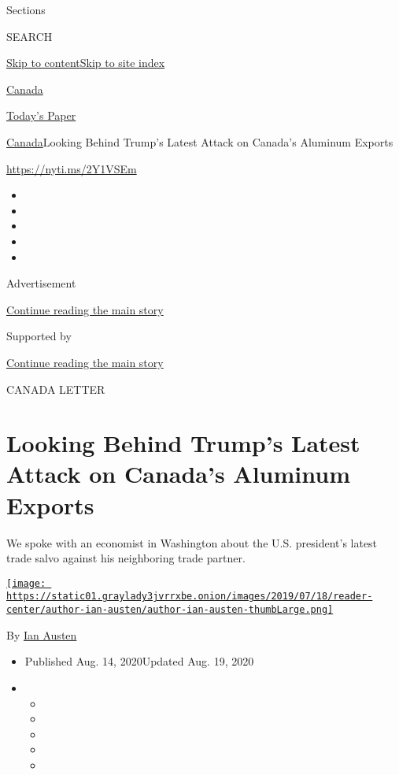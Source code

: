 Sections

SEARCH

\protect\hyperlink{site-content}{Skip to
content}\protect\hyperlink{site-index}{Skip to site index}

\href{https://www.nytimes3xbfgragh.onion/section/world/canada}{Canada}

\href{https://myaccount.nytimes3xbfgragh.onion/auth/login?response_type=cookie\&client_id=vi}{}

\href{https://www.nytimes3xbfgragh.onion/section/todayspaper}{Today's
Paper}

\href{/section/world/canada}{Canada}\textbar{}Looking Behind Trump's
Latest Attack on Canada's Aluminum Exports

\url{https://nyti.ms/2Y1VSEm}

\begin{itemize}
\item
\item
\item
\item
\item
\end{itemize}

Advertisement

\protect\hyperlink{after-top}{Continue reading the main story}

Supported by

\protect\hyperlink{after-sponsor}{Continue reading the main story}

CANADA LETTER

\hypertarget{looking-behind-trumps-latest-attack-on-canadas-aluminum-exports}{%
\section{Looking Behind Trump's Latest Attack on Canada's Aluminum
Exports}\label{looking-behind-trumps-latest-attack-on-canadas-aluminum-exports}}

We spoke with an economist in Washington about the U.S. president's
latest trade salvo against his neighboring trade partner.

\href{https://www.nytimes3xbfgragh.onion/by/ian-austen}{\texttt{[image: https://static01.graylady3jvrrxbe.onion/images/2019/07/18/reader-center/author-ian-austen/author-ian-austen-thumbLarge.png]}}

By \href{https://www.nytimes3xbfgragh.onion/by/ian-austen}{Ian Austen}

\begin{itemize}
\item
  Published Aug. 14, 2020Updated Aug. 19, 2020
\item
  \begin{itemize}
  \item
  \item
  \item
  \item
  \item
  \end{itemize}
\end{itemize}

